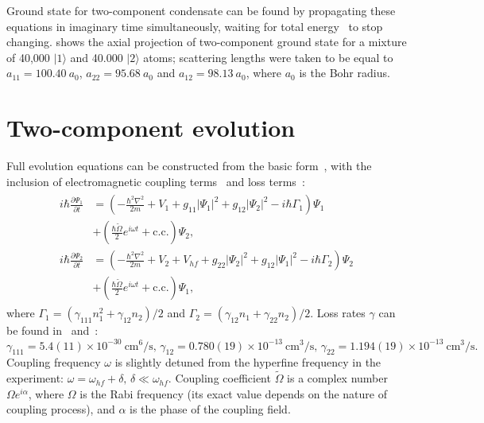 Ground state for two-component condensate can be found by propagating these equations in imaginary time simultaneously,
waiting for total energy~ to stop changing.
 shows the axial projection of two-component ground state for a mixture of 40,000 $\vert 1 \rangle$ and 40.000 $\vert 2 \rangle$ atoms;
scattering lengths were taken to be equal to $a_{11} = 100.40\ a_0$, $a_{22} = 95.68\ a_0$ and $a_{12} = 98.13\ a_0$, where $a_0$ is the Bohr radius.


\section{Two-component evolution}

Full evolution equations can be constructed from the basic form~,
with the inclusion of electromagnetic coupling terms~\cite{Pitaevskii2003}
and loss terms~\cite{Mertes2007}:
\begin{align}
\label{eqn:mean-field:two-comp-evolution-cgpes}
\begin{split}
	i \hbar \frac{\partial \Psi_1}{\partial t} & = \left(
		-\frac{\hbar^2 \nabla^2}{2 m} + V_1
		+ g_{11} \lvert \Psi_1 \rvert^2
		+ g_{12} \lvert \Psi_2 \rvert^2
		- i \hbar \Gamma_1
	\right) \Psi_1 \\
	& + \left(
		\frac{\hbar \tilde{\Omega}}{2} e^{i \omega t}
		+ \textrm{c.c.}
	\right) \Psi_2, \\
	i \hbar \frac{\partial \Psi_2}{\partial t} & = \left(
		-\frac{\hbar^2 \nabla^2}{2 m} + V_2 + V_{hf}
		+ g_{22} \lvert \Psi_2 \rvert^2
		+ g_{12} \lvert \Psi_1 \rvert^2
		- i \hbar \Gamma_2
	\right) \Psi_2 \\
	& + \left(
		\frac{\hbar \tilde{\Omega}}{2} e^{i \omega t}
		+ \textrm{c.c.}
	\right) \Psi_1,
\end{split}
\end{align}
where
$\Gamma_1 = \left( \gamma_{111} n_1^2 + \gamma_{12} n_2 \right) / 2$ and
$\Gamma_2 = \left( \gamma_{12} n_1 + \gamma_{22} n_2 \right) / 2$.
Loss rates $\gamma$ can be found in~\cite{Mertes2007} and~\cite{Burt1997}:
\[
	\gamma_{111} = 5.4(11) \times 10^{-30}\ \textrm{cm}^6/\textrm{s},\,
	\gamma_{12} = 0.780(19) \times 10^{-13}\ \textrm{cm}^3/\textrm{s},\,
	\gamma_{22} = 1.194(19) \times 10^{-13}\ \textrm{cm}^3/\textrm{s}.
\]
Coupling frequency $\omega$ is slightly detuned from the hyperfine frequency in the experiment:
$\omega = \omega_{hf} + \delta,\, \delta \ll \omega_{hf}$.
Coupling coefficient $\tilde{\Omega}$ is a complex number $\Omega e^{i \alpha}$,
where $\Omega$ is the Rabi frequency (its exact value depends on the nature of coupling process),
and $\alpha$ is the phase of the coupling field.


